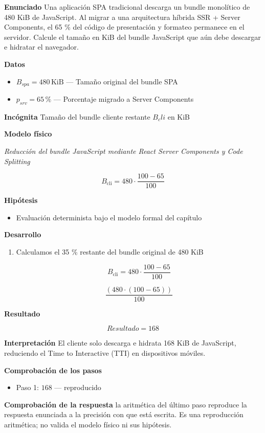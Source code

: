 \documentclass{book}
\begin{document}
\begin{tcolorbox}[title={Problema resuelto}, studiumworked, breakable]

\noindent\textbf{Enunciado}
Una aplicación SPA tradicional descarga un bundle monolítico de 480 KiB de JavaScript. Al migrar a una arquitectura híbrida SSR + Server Components, el 65 \% del código de presentación y formateo permanece en el servidor. Calcule el tamaño en KiB del bundle JavaScript que aún debe descargar e hidratar el navegador.

\noindent\textbf{Datos}
\begin{itemize}
\item $B_{spa} = 480\,\mathrm{KiB}$ — Tamaño original del bundle SPA
\item $p_{srv} = 65\,\mathrm{\%}$ — Porcentaje migrado a Server Components
\end{itemize}

\noindent\textbf{Incógnita}
Tamaño del bundle cliente restante \(B_cli\) en KiB

\noindent\textbf{Modelo físico}

\noindent\textit{Reducción del bundle JavaScript mediante React Server Components y Code Splitting}

\[
B_{\text{cli}} = 480 \cdot \frac{100 - 65}{100}
\]

\noindent\textbf{Hipótesis}
\begin{itemize}
\item Evaluación determinista bajo el modelo formal del capítulo
\end{itemize}

\noindent\textbf{Desarrollo}
\begin{enumerate}
\item
Calculamos el 35 \% restante del bundle original de 480 KiB

\[
B_{\text{cli}} = 480 \cdot \frac{100 - 65}{100}
\]

\[
\frac{\left(480\cdot \left(100-65\right)\right)}{100}
\]
\end{enumerate}

\noindent\textbf{Resultado}

\[
Resultado = 168
\]

\noindent\textbf{Interpretación}
El cliente solo descarga e hidrata 168 KiB de JavaScript, reduciendo el Time to Interactive (TTI) en dispositivos móviles.

\noindent\textbf{Comprobación de los pasos}
\begin{itemize}
\item Paso 1: $168$ — reproducido
\end{itemize}

\noindent\textbf{Comprobación de la respuesta} la aritmética del último paso reproduce la respuesta enunciada a la precisión con que está escrita. Es una reproducción aritmética; no valida el modelo físico ni sus hipótesis.
\end{tcolorbox}
\end{document}
